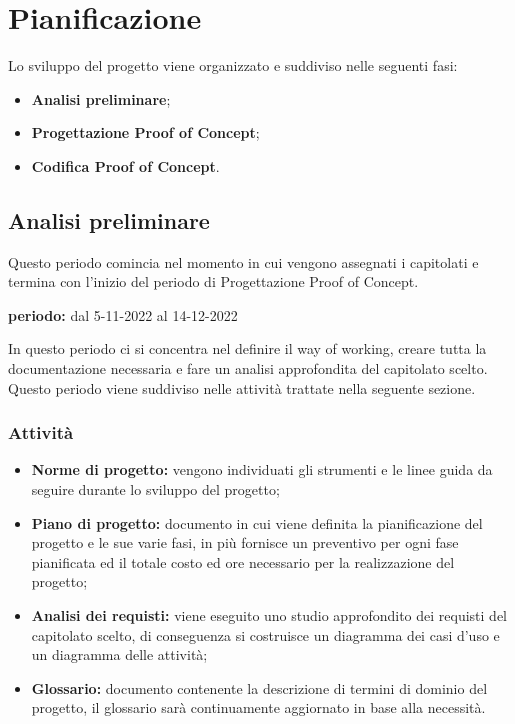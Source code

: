 \section{Pianificazione}
Lo sviluppo del progetto viene organizzato e suddiviso nelle seguenti fasi:
\begin{itemize}
\item \textbf{Analisi preliminare};
\item \textbf{Progettazione Proof of Concept};
\item \textbf{Codifica Proof of Concept}.
\end{itemize}


\subsection{Analisi preliminare}
Questo periodo comincia nel momento in cui vengono assegnati i capitolati e termina con l'inizio del periodo di Progettazione Proof of Concept.\\
\begin{center}
\textbf{periodo:} dal 5-11-2022 al 14-12-2022\\
\end{center}
In questo periodo ci si concentra nel definire il way of working, creare tutta la documentazione necessaria e fare un analisi approfondita del capitolato scelto.  Questo periodo viene suddiviso nelle attività trattate nella seguente sezione.

\subsubsection{Attività}
\begin{itemize}
\item \textbf{Norme di progetto:} vengono individuati gli strumenti e le linee guida da seguire durante lo sviluppo del progetto;
\item \textbf{Piano di progetto:} documento in cui viene definita la pianificazione del progetto e le sue varie fasi,  in più fornisce un preventivo per ogni fase pianificata ed il totale costo ed ore necessario per la realizzazione del progetto;
\item \textbf{Analisi dei requisti:} viene eseguito uno studio approfondito dei requisti del capitolato scelto,  di conseguenza si costruisce un diagramma dei casi d'uso e un diagramma delle attività;
\item \textbf{Glossario: } documento contenente la descrizione di termini di dominio del progetto, il glossario sarà continuamente aggiornato in base alla necessità.
\end{itemize}

